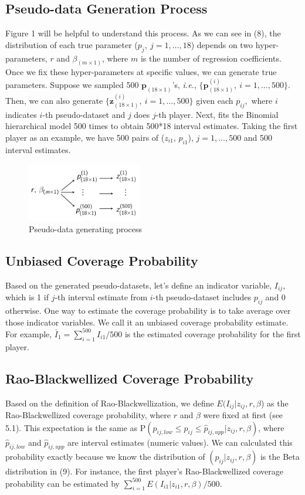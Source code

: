 \documentclass[article]{jss}
\begin{document}
\subsection{Pseudo-data Generation Process}
Figure 1 will be helpful to understand this process. As we can see in (8), the distribution of each true parameter ($p_{j},~j=1,\ldots, 18$) depends on two hyper-parameters, $r$ and $\beta_{(m\times1)}$, where $m$ is the number of regression coefficients. Once we fix these hyper-parameters at specific values, we can generate true parameters. Suppose we sampled 500 $\textbf{p}_{(18\times1)}$'s, \emph{i.e.}, $\{\textbf{p}^{(i)}_{(18\times1)},~i=1, \ldots, 500\}$. Then, we can also generate $\{\textbf{z}^{(i)}_{(18\times1)},~i=1, \ldots, 500\}$ given each $p_{ij},$ where $i$ indicates $i$-th pseudo-dataset and $j$ does $j$-th player. Next,  fits the Binomial hierarchical model 500 times to obtain 500*18 interval estimates. Taking the first player as an example, we have 500 pairs of ($z_{i1}$, $p_{i1}$), $j=1,\ldots, 500$ and 500 interval estimates.
\begin{figure}[h]
\begin{center}
\includegraphics[width=5cm]{process.png}
\caption{Pseudo-data generating process}
\end{center}
\end{figure}

\subsection{Unbiased Coverage Probability}
Based on the generated pseudo-datasets, let's define an indicator variable, $I_{ij}$, which is 1 if $j$-th interval estimate from $i$-th pseudo-dataset includes $p_{ij}$ and 0 otherwise. One way to estimate the coverage probability is to take average over those indicator variables. We call it an unbiased coverage probability estimate. For example, $\bar{I}_{1}=\sum_{i=1}^{500}I_{i1}/500$ is the estimated coverage probability for the first player.
\subsection{Rao-Blackwellized Coverage Probability}
Based on the definition of Rao-Blackwellization, we define $E(I_{ij}\vert z_{ij}, r, \beta$) as the Rao-Blackwellized coverage probability, where $r$ and $\beta$ were fixed at first (see 5.1). This expectation is the same as P$(\hat{p}_{ij, low}\le p_{ij} \le\hat{p}_{ij, upp}\vert z_{ij}, r, \beta)$, where $\hat{p}_{ij, low}$ and $\hat{p}_{ij, upp}$ are interval estimates (numeric values). We can calculated this probability exactly because we know the distribution of $(p_{ij} \vert z_{ij}, r, \beta)$ is the Beta distribution in (9). For instance, the first player's Rao-Blackwellized coverage probability can be estimated by $\sum_{i=1}^{500}E(I_{i1}\vert z_{i1}, r, \beta)/500$.
\end{document}
